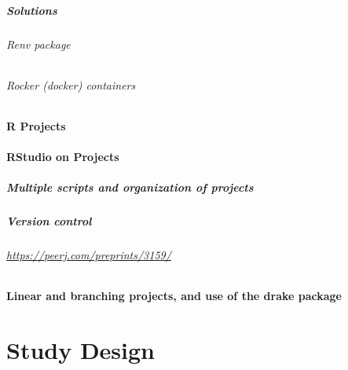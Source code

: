 \documentclass[
]{book}
\begin{document}
\hypertarget{solutions}{%
\paragraph{Solutions}\label{solutions}}

\hypertarget{renv-package}{%
\subparagraph{Renv package}\label{renv-package}}

\hypertarget{rocker-docker-containers}{%
\subparagraph{Rocker (docker) containers}\label{rocker-docker-containers}}

\hypertarget{r-projects}{%
\subsubsection{R Projects}\label{r-projects}}

\hypertarget{rstudio-on-projects}{%
\subsubsection{RStudio on Projects}\label{rstudio-on-projects}}

\hypertarget{multiple-scripts-and-organization-of-projects}{%
\paragraph{Multiple scripts and organization of projects}\label{multiple-scripts-and-organization-of-projects}}

\hypertarget{version-control}{%
\paragraph{Version control}\label{version-control}}

\hypertarget{httpspeerj.compreprints3159}{%
\subparagraph{\texorpdfstring{\url{https://peerj.com/preprints/3159/}}{https://peerj.com/preprints/3159/}}\label{httpspeerj.compreprints3159}}

\hypertarget{linear-and-branching-projects-and-use-of-the-drake-package}{%
\subsubsection{Linear and branching projects, and use of the drake package}\label{linear-and-branching-projects-and-use-of-the-drake-package}}

\hypertarget{study-design}{%
\chapter{Study Design}\label{study-design}}
\end{document}
